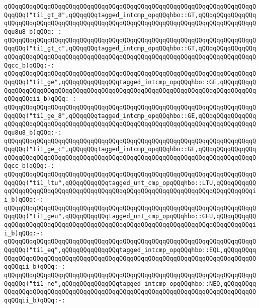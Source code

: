 \verb|qQQqqQQqqQQqqQQqqQQqqQQqqQQqqQQqqQQqqQQqqQQqqQQqqQQqqQQqqQQqqQQqqQQqqQQqqQQq("ti1_gt_8",qQQqqQQqtagged_intcmp_opqQQqhbo::GT,qQQqqQQqqQQqqQQqqQQqqQQqqQQqqQQqqQQqqQQqqQQqqQQqqQQqqQQqqQQqqQQqqQQqqQQqqQQqqQQqqQQqqQQqu8u8_b)qQQq:-:|\newline
\verb|qQQqqQQqqQQqqQQqqQQqqQQqqQQqqQQqqQQqqQQqqQQqqQQqqQQqqQQqqQQqqQQqqQQqqQQqqQQq("ti1_gt_c",qQQqqQQqtagged_intcmp_opqQQqhbo::GT,qQQqqQQqqQQqqQQqqQQqqQQqqQQqqQQqqQQqqQQqqQQqqQQqqQQqqQQqqQQqqQQqqQQqqQQqqQQqqQQqqQQqqQQqcc_b)qQQq:-:|\newline
\newline
\verb|qQQqqQQqqQQqqQQqqQQqqQQqqQQqqQQqqQQqqQQqqQQqqQQqqQQqqQQqqQQqqQQqqQQqqQQqqQQq("ti1_ge",qQQqqQQqqQQqqQQqtagged_intcmp_opqQQqhbo::GE,qQQqqQQqqQQqqQQqqQQqqQQqqQQqqQQqqQQqqQQqqQQqqQQqqQQqqQQqqQQqqQQqqQQqqQQqqQQqqQQqqQQqqQQqii_b)qQQq:-:|\newline
\verb|qQQqqQQqqQQqqQQqqQQqqQQqqQQqqQQqqQQqqQQqqQQqqQQqqQQqqQQqqQQqqQQqqQQqqQQqqQQq("ti1_ge_8",qQQqqQQqtagged_intcmp_opqQQqhbo::GE,qQQqqQQqqQQqqQQqqQQqqQQqqQQqqQQqqQQqqQQqqQQqqQQqqQQqqQQqqQQqqQQqqQQqqQQqqQQqqQQqqQQqqQQqu8u8_b)qQQq:-:|\newline
\verb|qQQqqQQqqQQqqQQqqQQqqQQqqQQqqQQqqQQqqQQqqQQqqQQqqQQqqQQqqQQqqQQqqQQqqQQqqQQq("ti1_ge_c",qQQqqQQqtagged_intcmp_opqQQqhbo::GE,qQQqqQQqqQQqqQQqqQQqqQQqqQQqqQQqqQQqqQQqqQQqqQQqqQQqqQQqqQQqqQQqqQQqqQQqqQQqqQQqqQQqqQQqcc_b)qQQq:-:|\newline
\newline
\verb|qQQqqQQqqQQqqQQqqQQqqQQqqQQqqQQqqQQqqQQqqQQqqQQqqQQqqQQqqQQqqQQqqQQqqQQqqQQq("ti1_ltu",qQQqqQQqqQQqtagged_unt_cmp_opqQQqhbo::LTU,qQQqqQQqqQQqqQQqqQQqqQQqqQQqqQQqqQQqqQQqqQQqqQQqqQQqqQQqqQQqqQQqqQQqqQQqqQQqqQQqii_b)qQQq:-:|\newline
\verb|qQQqqQQqqQQqqQQqqQQqqQQqqQQqqQQqqQQqqQQqqQQqqQQqqQQqqQQqqQQqqQQqqQQqqQQqqQQq("ti1_geu",qQQqqQQqqQQqtagged_unt_cmp_opqQQqhbo::GEU,qQQqqQQqqQQqqQQqqQQqqQQqqQQqqQQqqQQqqQQqqQQqqQQqqQQqqQQqqQQqqQQqqQQqqQQqqQQqqQQqii_b)qQQq:-:|\newline
\verb|qQQqqQQqqQQqqQQqqQQqqQQqqQQqqQQqqQQqqQQqqQQqqQQqqQQqqQQqqQQqqQQqqQQqqQQqqQQq("ti1_eq",qQQqqQQqqQQqqQQqtagged_intcmp_opqQQqhbo::EQL,qQQqqQQqqQQqqQQqqQQqqQQqqQQqqQQqqQQqqQQqqQQqqQQqqQQqqQQqqQQqqQQqqQQqqQQqqQQqqQQqqQQqii_b)qQQq:-:|\newline
\verb|qQQqqQQqqQQqqQQqqQQqqQQqqQQqqQQqqQQqqQQqqQQqqQQqqQQqqQQqqQQqqQQqqQQqqQQqqQQq("ti1_ne",qQQqqQQqqQQqqQQqtagged_intcmp_opqQQqhbo::NEQ,qQQqqQQqqQQqqQQqqQQqqQQqqQQqqQQqqQQqqQQqqQQqqQQqqQQqqQQqqQQqqQQqqQQqqQQqqQQqqQQqqQQqii_b)qQQq:-:|\newline
